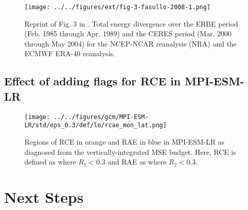 \documentclass[11pt]{article}
\begin{document}
\begin{figure}[htbp]
\centering
\texttt{[image: ../../figures/ext/fig-3-fasullo-2008-1.png]}
\caption{\label{fig:org1cfa519}Reprint of Fig. 3 in \cite{fasullo_annual_2008-1}. Total energy divergence over the ERBE period (Feb. 1985 through Apr. 1989) and the CERES period (Mar. 2000 through May 2004) for the NCEP-NCAR reanalysis (NRA) and the ECMWF ERA-40 reanalysis.}
\end{figure}

\subsection{Effect of adding flags for RCE in MPI-ESM-LR}
\label{sec:org9b1c8ac}

\begin{figure}[htbp]
\centering
\texttt{[image: ../../figures/gcm/MPI-ESM-LR/std/eps\_0.3/def/lo/rcae\_mon\_lat.png]}
\caption{\label{fig:orgea68b49}Regions of RCE in orange and RAE in blue in MPI-ESM-LR as diagnosed from the vertically-integrated MSE budget. Here, RCE is defined as where \(R_1 < 0.3\) and RAE as where \(R_2 < 0.3\).}
\end{figure}

\section{Next Steps}
\label{sec:org1c6f734}



\end{document}
